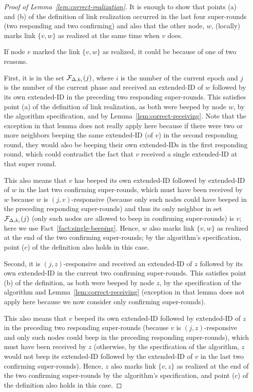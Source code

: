 \begin{proof}[Proof of Lemma~\ref{lem:correct-realization}]
It is enough to show that points (a) and (b) of the definition of link realization occurred in the last four super-rounds (two responding and two confirming) and also that the other node, $w$, (locally) marks link $\{v,w\}$ as realized at the same time when $v$ does.

If node $v$ marked the link $\{v,w\}$ as realized, it could be because of one of two reasons. 

First, it is in the set $\mathcal{F}_{\Delta,k_i}(j)$, where $i$ is the number of the current epoch and $j$ is the number of the current phase and received an extended-ID of $w$ followed by its own extended-ID in the preceding two responding super-rounds. This satisfies point (a) of the definition of link realization, as both were beeped by node $w$, by the algorithm specification, and by Lemma~\ref{lem:correct-receiving}. Note that the exception in that lemma does not really apply here because if there were two or more neighbors beeping the same extended-ID (of $v$) in the second responding round, they would also be beeping their own extended-IDs in the first responding round, which could contradict the fact that $v$ received a single extended-ID at that super round.

This also means that $v$ has beeped its own extended-ID followed by extended-ID of $w$ in the last two confirming super-rounds, which must have been received by $w$ because $w$ is $(j,v)$-responsive (because only such nodes could have beeped in the preceding responding super-rounds) and thus its only neighbor in set $\mathcal{F}_{\Delta,k_i}(j)$ (only such nodes are allowed to beep in confirming super-rounds) is $v$; here we use Fact~\ref{fact:single-beeping}. Hence, $w$ also marks link 
$\{v,w\}$ as realized at the end of the two confirming super-rounds; by the algorithm's specification, point (c) of the definition also holds in this case.

Second, it is $(j,z)$-responsive and received an extended-ID of $z$ followed by its own extended-ID in the current two confirming super-rounds. This satisfies point (b) of the definition, as both were beeped by node $z$, by the specification of the algorithm and Lemma~\ref{lem:correct-receiving} (exception in that lemma does not apply here because we now consider only confirming super-rounds).

This also means that $v$ beeped its own extended-ID followed by extended-ID of $z$ in the preceding two responding super-rounds (because $v$ is $(j,z)$-responsive and only such nodes could beep in the preceding responding super-rounds), which must have been received by $z$ (otherwise, by the specification of the algorithm, $z$ would not beep its extended-ID followed by the extended-ID of $v$ in the last two confirming super-rounds). Hence, $z$ also marks link $\{v,z\}$ as realized at the end of the two confirming super-rounds by the algorithm's specification, and point (c) of the definition also holds in this case.
\end{proof}




